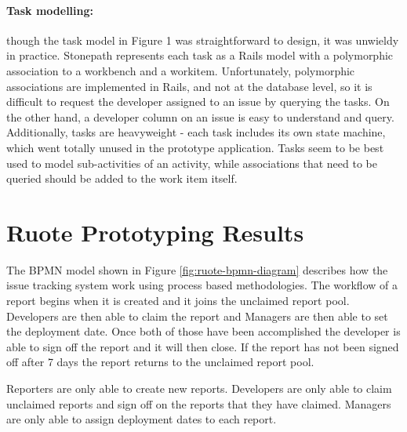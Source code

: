 \paragraph{Task modelling:} though the task model in Figure 1 was straightforward to design, it was unwieldy in practice. Stonepath represents each task as a Rails model with a polymorphic association to a workbench and a workitem. Unfortunately, polymorphic associations are implemented in Rails, and not at the database level, so it is difficult to request the developer assigned to an issue by querying the tasks. On the other hand, a developer column on an issue is easy to understand and query. Additionally, tasks are heavyweight - each task includes its own state machine, which went totally unused in the prototype application. Tasks seem to be best used to model sub-activities of an activity, while associations that need to be queried should be added to the work item itself.


\FloatBarrier

\section {Ruote Prototyping Results}
\label {sec:ruote-prototyping-results}

The BPMN model shown in Figure \ref{fig:ruote-bpmn-diagram} describes how the issue tracking system work using process based methodologies. The workflow of a report begins when it is created and it joins the unclaimed report pool. Developers are then able to claim the report and Managers are then able to set the deployment date. Once both of those have been accomplished the developer is able to sign off the report and it will then close. If the report has not been signed off after 7 days the report returns to the unclaimed report pool.

Reporters are only able to create new reports. Developers are only able to claim unclaimed reports and sign off on the reports that they have claimed. Managers are only able to assign deployment dates to each report.


